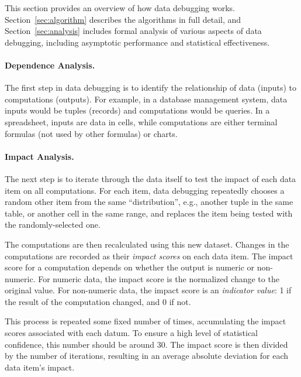 This section provides an overview of how data debugging
works. Section~\ref{sec:algorithm} describes the algorithms in full
detail, and Section~\ref{sec:analysis} includes formal analysis of various
aspects of data debugging, including asymptotic performance and
statistical effectiveness.

\paragraph{Dependence Analysis.}
The first step in data debugging is to identify the relationship of
data (inputs) to computations (outputs). For example, in a database
management system, data inputs would be tuples (records) and computations would
be queries. In a spreadsheet, inputs are data in cells, while
computations are either terminal formulas (not used by other formulas)
or charts.

\paragraph{Impact Analysis.}
The next step is to iterate through the data itself to test the impact
of each data item on all computations. For each item, data debugging
repeatedly chooses a random other item from the same ``distribution'',
e.g., another tuple in the same table, or another cell in the same
range, and replaces the item being tested with the randomly-selected
one.

The computations are then recalculated using this new dataset. Changes
in the computations are recorded as their \emph{impact scores} on each
data item.  The impact score for a computation depends on whether the
output is numeric or non-numeric. For numeric data, the impact score
is the normalized change to the original value.
For non-numeric data, the impact score is an \emph{indicator value}: 1
if the result of the computation changed, and 0 if not.


This process is repeated some fixed number of times, accumulating the
impact scores associated with each datum. To ensure a high level of
statistical confidence, this number should be around 30. The impact
score is then divided by the number of iterations, resulting in an
average absolute deviation for each data item's impact.

